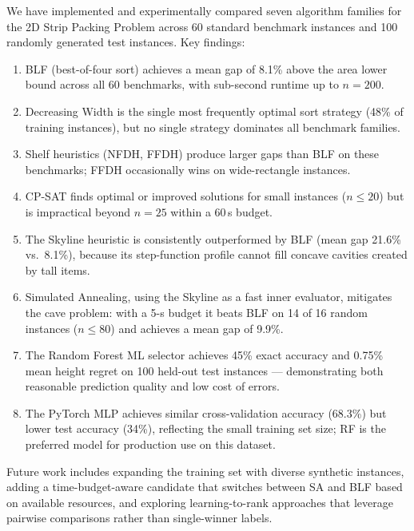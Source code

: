 \documentclass[11pt,a4paper]{article}
\begin{document}
We have implemented and experimentally compared seven algorithm families for
the 2D Strip Packing Problem across 60 standard benchmark instances and
100 randomly generated test instances.
Key findings:
\begin{enumerate}
  \item BLF (best-of-four sort) achieves a mean gap of 8.1\% above the area
        lower bound across all 60 benchmarks, with sub-second runtime up to
        $n=200$.
  \item Decreasing Width is the single most frequently optimal sort strategy
        (48\% of training instances), but no single strategy dominates all
        benchmark families.
  \item Shelf heuristics (NFDH, FFDH) produce larger gaps than BLF on these
        benchmarks; FFDH occasionally wins on wide-rectangle instances.
  \item CP-SAT finds optimal or improved solutions for small instances
        ($n \le 20$) but is impractical beyond $n=25$ within a 60\,s budget.
  \item The Skyline heuristic is consistently outperformed by BLF (mean gap
        21.6\% vs.\ 8.1\%), because its step-function profile cannot fill
        concave cavities created by tall items.
  \item Simulated Annealing, using the Skyline as a fast inner evaluator,
        mitigates the cave problem: with a 5-s budget it beats BLF on 14 of
        16 random instances ($n \le 80$) and achieves a mean gap of 9.9\%.
  \item The Random Forest ML selector achieves 45\% exact accuracy and 0.75\%
        mean height regret on 100 held-out test instances — demonstrating both
        reasonable prediction quality and low cost of errors.
  \item The PyTorch MLP achieves similar cross-validation accuracy (68.3\%)
        but lower test accuracy (34\%), reflecting the small training set size;
        RF is the preferred model for production use on this dataset.
\end{enumerate}

Future work includes expanding the training set with diverse synthetic
instances, adding a time-budget-aware candidate that switches between
SA and BLF based on available resources, and exploring learning-to-rank
approaches that leverage pairwise comparisons rather than single-winner labels.
\end{document}

